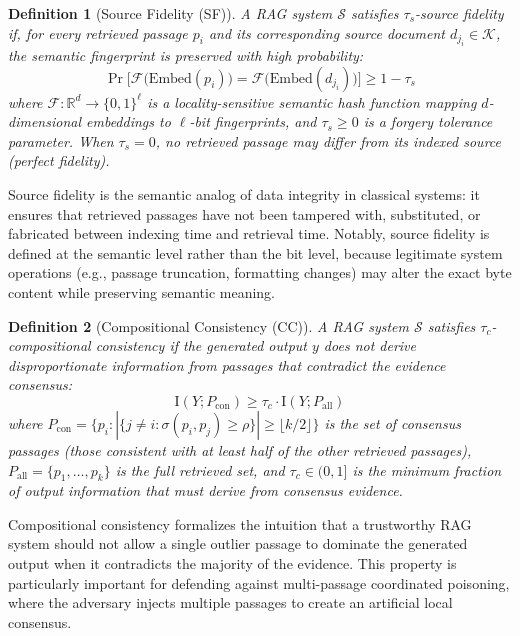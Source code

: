 \documentclass[journal,10pt]{IEEEtran}
\newtheorem{definition}{Definition}
\newcommand{\R}{\mathbb{R}}
\newcommand{\MI}{\mathrm{I}}
\newcommand{\calS}{\mathcal{S}}
\newcommand{\calF}{\mathcal{F}}
\newcommand{\calK}{\mathcal{K}}
\begin{document}
\begin{definition}[Source Fidelity (SF)]\label{def:sf}
A RAG system $\calS$ satisfies $\tau_s$-source fidelity if, for every retrieved passage $p_i$ and its corresponding source document $d_{j_i} \in \calK$, the semantic fingerprint is preserved with high probability:
\begin{equation}\label{eq:sf}
\Pr\Big[\calF\big(\text{Embed}(p_i)\big) = \calF\big(\text{Embed}(d_{j_i})\big)\Big] \geq 1 - \tau_s
\end{equation}
where $\calF: \R^d \to \{0,1\}^\ell$ is a locality-sensitive semantic hash function mapping $d$-dimensional embeddings to $\ell$-bit fingerprints, and $\tau_s \geq 0$ is a forgery tolerance parameter. When $\tau_s = 0$, no retrieved passage may differ from its indexed source (perfect fidelity).
\end{definition}

Source fidelity is the semantic analog of data integrity in classical systems: it ensures that retrieved passages have not been tampered with, substituted, or fabricated between indexing time and retrieval time. Notably, source fidelity is defined at the semantic level rather than the bit level, because legitimate system operations (e.g., passage truncation, formatting changes) may alter the exact byte content while preserving semantic meaning.

\begin{definition}[Compositional Consistency (CC)]\label{def:cc}
A RAG system $\calS$ satisfies $\tau_c$-compositional consistency if the generated output $y$ does not derive disproportionate information from passages that contradict the evidence consensus:
\begin{equation}\label{eq:cc}
\MI(Y; P_{\text{con}}) \geq \tau_c \cdot \MI(Y; P_{\text{all}})
\end{equation}
where $P_{\text{con}} = \{p_i : |\{j \neq i : \sigma(p_i, p_j) \geq \rho\}| \geq \lfloor k/2 \rfloor\}$ is the set of consensus passages (those consistent with at least half of the other retrieved passages), $P_{\text{all}} = \{p_1, \ldots, p_k\}$ is the full retrieved set, and $\tau_c \in (0, 1]$ is the minimum fraction of output information that must derive from consensus evidence.
\end{definition}

Compositional consistency formalizes the intuition that a trustworthy RAG system should not allow a single outlier passage to dominate the generated output when it contradicts the majority of the evidence. This property is particularly important for defending against multi-passage coordinated poisoning, where the adversary injects multiple passages to create an artificial local consensus.
\end{document}
